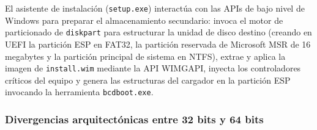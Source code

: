 \documentclass[12pt]{article}
\begin{document}
El asistente de instalación (\texttt{setup.exe}) interactúa con las APIs de bajo nivel de Windows para preparar el almacenamiento secundario: invoca el motor de particionado de \texttt{diskpart} para estructurar la unidad de disco destino (creando en UEFI la partición ESP en FAT32, la partición reservada de Microsoft MSR de 16 megabytes y la partición principal de sistema en NTFS), extrae y aplica la imagen de \texttt{install.wim} mediante la API WIMGAPI, inyecta los controladores críticos del equipo y genera las estructuras del cargador en la partición ESP invocando la herramienta \texttt{bcdboot.exe}.

\subsubsection{Divergencias arquitectónicas entre 32 bits y 64 bits}
\end{document}
